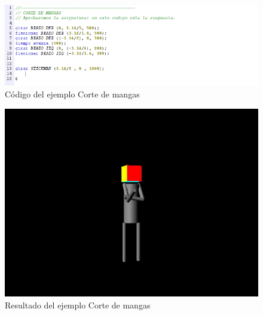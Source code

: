 \documentclass[a4paper, 12pt]{book}
\begin{document}
\begin{itemize}
  \begin{figure}[htb]
    \centerline{\includegraphics[width=\textwidth]{./imagenes/cortemangas-codigo.png}}
    \caption{Código del ejemplo Corte de mangas}
  \end{figure}
  
  
  \begin{figure}[htb]
    \centerline{\includegraphics[width=\textwidth]{./imagenes/cortemangas-resultado.png}}
\caption{Resultado del ejemplo Corte de mangas}
\end{figure}

\end{itemize} %
\end{document}

